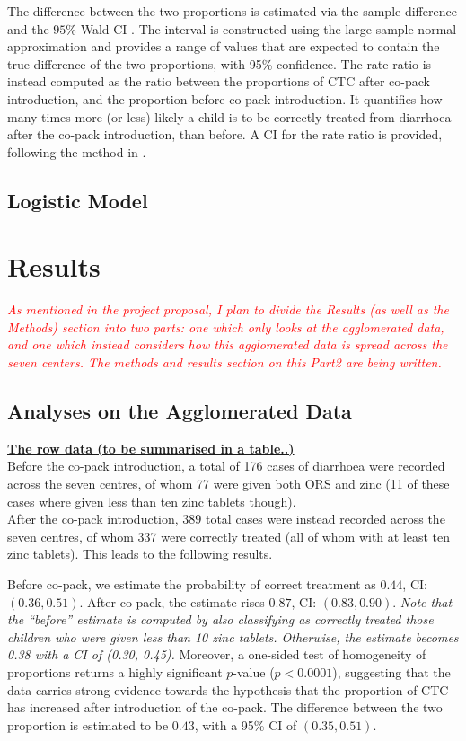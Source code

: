 \documentclass[a4paper, 12pt]{article}
\newcommand{\red}{\textcolor{red}}
\begin{document}
The difference between the two proportions is estimated via the sample difference and the $95\%$ Wald CI \cite{agresti2002}. The interval is constructed using the large-sample normal approximation and provides a range of values that are expected to contain the true difference of the two proportions, with 95\% confidence. 
The rate ratio is instead computed as the ratio between the proportions of CTC after co-pack introduction, and the proportion before co-pack introduction. It quantifies how many times more (or less) likely a child is to be correctly treated from diarrhoea after the co-pack introduction, than before. A CI for the rate ratio is provided, following the method in \cite{agresti2002, nam1995}.


\subsection{Logistic Model}



\section{Results}

{\small \it \red{As mentioned in the project proposal, I plan to divide the Results (as well as the Methods) section into two parts: one which only looks at the agglomerated data, and one which instead considers how this agglomerated data is spread across the seven centers. The methods and results section on this Part2 are being written.}}

\subsection{Analyses on the Agglomerated Data}
{\bf \underline{The row data (to be summarised in a table..)}}\\[1ex]
Before the co-pack introduction, a total of 176 cases of diarrhoea were recorded across the seven centres, of whom 77 were given both ORS and zinc (11 of these cases where given less than ten zinc tablets though).
\\
After the co-pack introduction, 389 total cases were instead recorded across the seven centres, of whom 337 were correctly treated (all of whom with at least ten zinc tablets). This leads to the following results.

Before co-pack, we estimate the probability of correct treatment as $0.44$, CI: $(0.36, 0.51)$. After co-pack, the estimate rises $0.87$, CI: $(0.83, 0.90)$.
{\it \footnotesize Note that the ``before'' estimate is computed by also classifying as correctly treated those children who were given less than 10 zinc tablets. Otherwise, the estimate becomes 0.38 with a CI of (0.30, 0.45).}
Moreover, a one-sided test of homogeneity of proportions returns a highly significant $p$-value ($p<0.0001$), suggesting that the data carries strong evidence towards the hypothesis that the proportion of CTC has increased after introduction of the co-pack.
The difference between the two proportion is estimated to be $0.43$, with a 95\% CI of $(0.35, 0.51)$.
\end{document}
